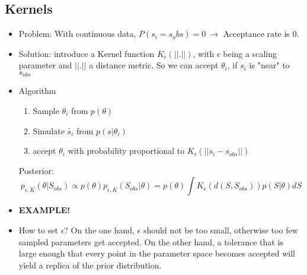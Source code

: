 \documentclass[10pt,a4paper]{report}
\begin{document}
\subsection{Kernels}
\begin{itemize}
\item Problem: With continuous data, $P(s_i=s_obs)=0 \ \rightarrow$ Acceptance rate is $0$.
\item Solution: introduce a Kernel function $K_{\epsilon}(||.||)$, with $\epsilon$ being a scaling parameter  and $||.||$ a distance metric. So we can accept $\theta_i$, if $s_i$ is "near" to $s_{obs}$
\item Algorithm
\begin{enumerate}
\item Sample  $\theta_i$ from  $p(\theta)$
\item Simulate $\tilde{s_i}$ from $p(s|\theta_i)$
\item accept $\theta_i$ with probability proportional to $K_{\epsilon}(||s_i-s_{obs}||)$ 
\end{enumerate} 
Posterior:
\begin{equation}
p_{\epsilon,K}(\theta|S_{obs})\propto p(\theta)p_{\epsilon,K}(S_{obs}|\theta)=p(\theta)\int K_{\epsilon}(d(S,S_{obs}))p(S|\theta)dS
\end{equation}

\item \textbf{EXAMPLE!}
\item How to set $\epsilon$? On the one hand, $\epsilon$ should not be too small, otherwise too few sampled parameters get accepted. On the other hand, a tolerance that is large enough that every point in the parameter space becomes accepted will yield a replica of the prior distribution.

\end{itemize}
\end{document}
